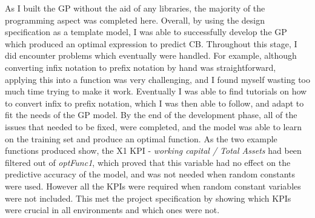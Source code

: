 \documentclass[11pt]{article}
\begin{document}
As I built the GP without the aid of any libraries, the majority of the programming aspect was completed here. Overall, by using the design specification as a template model, I was able to successfully develop the GP which produced an optimal expression to predict CB. Throughout this stage, I did encounter problems which eventually were handled. For example, although converting infix notation to prefix notation by hand was straightforward, applying this into a function was very challenging, and I found myself wasting too much time trying to make it work. Eventually I was able to find tutorials on how to convert infix to prefix notation, which I was then able to follow, and adapt to fit the needs of the GP model. By the end of the development phase, all of the issues that needed to be fixed, were completed, and the model was able to learn on the training set and produce an optimal function. As the two example functions produced show, the X1 KPI - \textit{working capital / Total Assets} had been filtered out of \textit{optFunc1}, which proved that this variable had no effect on the predictive accuracy of the model, and was not needed when random constants were used. However all the KPIs were required when random constant variables were not included. This met the project specification by showing which KPIs were crucial in all environments and which ones were not.\\
\end{document}
